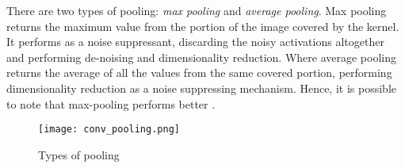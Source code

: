 There are two types of pooling: \textit{max pooling} and \textit{average pooling}. Max pooling returns the maximum value from the portion of the image covered by the kernel. It performs as a noise suppressant, discarding the noisy activations altogether and performing de-noising and dimensionality reduction. Where average pooling returns the average of all the values from the same covered portion, performing dimensionality reduction as a noise suppressing mechanism. Hence, it is possible to note that max-pooling performs better \cite{compguideCnn}.

\begin{figure}[h]
	\centering
    \texttt{[image: conv\_pooling.png]}
	\caption{Types of pooling \cite{compguideCnn}}
	\label{fig:cnn_pooling}
\end{figure}
